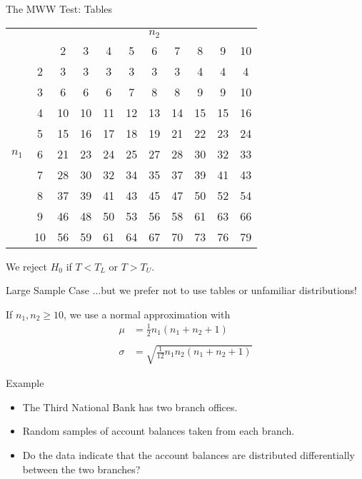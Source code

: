 \begin{frame}{The MWW Test: Tables}
    \begin{table}[h]
    \centering
    \begin{tabular}{cc|ccccccccc|}
        && \multicolumn{9}{c|}{$n_2$} \\
        && 2 & 3 & 4 & 5 & 6 & 7 & 8 & 9 & 10 \\ \hline
        \multirow{10}{*}{$n_1$} 
         & 2 & 3 & 3 & 3 & 3 & 3 & 3 & 4 & 4 & 4 \\
         & 3 & 6 & 6 & 6 & 7 & 8 & 8 & 9 & 9 & 10 \\ 
         & 4 & 10 & 10 & 11 & 12 & 13 & 14 & 15 & 15 & 16 \\
         & 5 & 15 & 16 & 17 & 18 & 19 & 21 & 22 & 23 & 24 \\
         & 6 & 21 & 23 & 24 & 25 & 27 & 28 & 30 & 32 & 33 \\
         & 7 & 28 & 30 & 32 & 34 & 35 & 37 & 39 & 41 & 43 \\
         & 8 & 37 & 39 & 41 & 43 & 45 & 47 & 50 & 52 & 54 \\
         & 9 & 46 & 48 & 50 & 53 & 56 & 58 & 61 & 63 & 66 \\
         & 10 & 56 & 59 & 61 & 64 & 67 & 70 & 73 & 76 & 79 \\
         \hline
    \end{tabular}
\end{table}
We reject $H_0$ if $T < T_L$ or $T > T_U$.
\end{frame}

\begin{frame}{Large Sample Case}
    ...but we prefer not to use tables or unfamiliar distributions!
    
    \vspace{12pt}If $n_1, n_2 \ge 10$, we use a normal approximation with
    \begin{align*}
        \mu &= \frac{1}{2}n_1(n_1 + n_2 + 1) \\ \\
        \sigma &= \sqrt{\frac{1}{12}n_1 n_2 (n_1 + n_2 + 1)}
    \end{align*}
\end{frame}

\begin{frame}{Example}
    \begin{itemize}
        \item The Third National Bank has two branch offices. 
        \item Random samples of account balances taken from each branch.
        \item Do the data indicate that the account balances are distributed differentially between the two branches?
    \end{itemize}
\end{frame}

